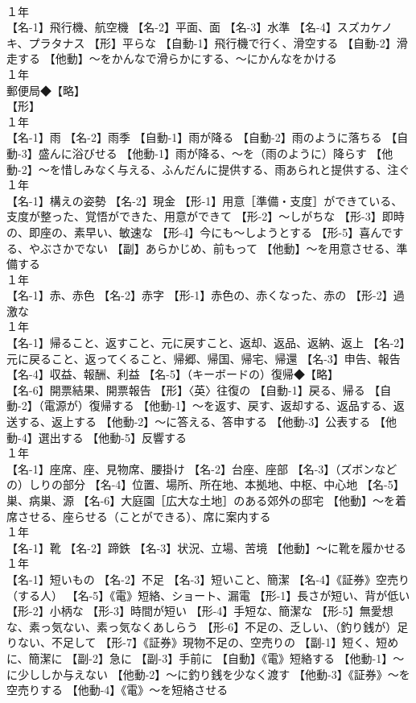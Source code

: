 \documentclass[8pt]{extreport}
\begin{document}
\begin{CJK}{UTF8}{min}
\\	１年	
\\	【名-1】飛行機、航空機 【名-2】平面、面 【名-3】水準 【名-4】スズカケノキ、プラタナス 【形】平らな 【自動-1】飛行機で行く、滑空する 【自動-2】滑走する 【他動】～をかんなで滑らかにする、～にかんなをかける
\\	１年	
\\	郵便局◆【略】
\\	【形】
\\	１年	
\\	【名-1】雨 【名-2】雨季 【自動-1】雨が降る 【自動-2】雨のように落ちる 【自動-3】盛んに浴びせる 【他動-1】雨が降る、～を（雨のように）降らす 【他動-2】～を惜しみなく与える、ふんだんに提供する、雨あられと提供する、注ぐ
\\	１年	
\\	【名-1】構えの姿勢 【名-2】現金 【形-1】用意［準備・支度］ができている、支度が整った、覚悟ができた、用意ができて 【形-2】～しがちな 【形-3】即時の、即座の、素早い、敏速な 【形-4】今にも～しようとする 【形-5】喜んでする、やぶさかでない 【副】あらかじめ、前もって 【他動】～を用意させる、準備する
\\	１年	
\\	【名-1】赤、赤色 【名-2】赤字 【形-1】赤色の、赤くなった、赤の 【形-2】過激な
\\	１年	
\\	【名-1】帰ること、返すこと、元に戻すこと、返却、返品、返納、返上 【名-2】元に戻ること、返ってくること、帰郷、帰国、帰宅、帰還 【名-3】申告、報告 【名-4】収益、報酬、利益 【名-5】（キーボードの）復帰◆【略】
\\	【名-6】開票結果、開票報告 【形】〈英〉往復の 【自動-1】戻る、帰る 【自動-2】（電源が）復帰する 【他動-1】～を返す、戻す、返却する、返品する、返送する、返上する 【他動-2】～に答える、答申する 【他動-3】公表する 【他動-4】選出する 【他動-5】反響する
\\	１年	
\\	【名-1】座席、座、見物席、腰掛け 【名-2】台座、座部 【名-3】（ズボンなどの）しりの部分 【名-4】位置、場所、所在地、本拠地、中枢、中心地 【名-5】巣、病巣、源 【名-6】大庭園［広大な土地］のある郊外の邸宅 【他動】～を着席させる、座らせる（ことができる）、席に案内する
\\	１年	
\\	【名-1】靴 【名-2】蹄鉄 【名-3】状況、立場、苦境 【他動】～に靴を履かせる
\\	１年	
\\	【名-1】短いもの 【名-2】不足 【名-3】短いこと、簡潔 【名-4】《証券》空売り（する人） 【名-5】《電》短絡、ショート、漏電 【形-1】長さが短い、背が低い 【形-2】小柄な 【形-3】時間が短い 【形-4】手短な、簡潔な 【形-5】無愛想な、素っ気ない、素っ気なくあしらう 【形-6】不足の、乏しい、（釣り銭が）足りない、不足して 【形-7】《証券》現物不足の、空売りの 【副-1】短く、短めに、簡潔に 【副-2】急に 【副-3】手前に 【自動】《電》短絡する 【他動-1】～に少ししか与えない 【他動-2】～に釣り銭を少なく渡す 【他動-3】《証券》～を空売りする 【他動-4】《電》～を短絡させる

\end{CJK}
\end{document}
